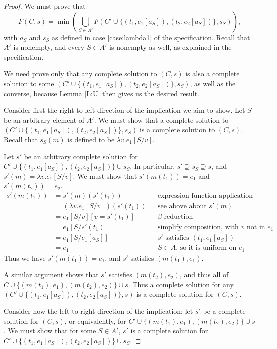\documentclass{article}
\begin{document}
\begin{proof}
We must prove that
	$$ 	F(C,s) = \min\left(\bigcup_{S\in A'} F(C'\cup\{(t_1,e_1[a_S]),(t_2,e_2[a_S])\},s_S)\right),	$$
with $a_S$ and $s_S$ as defined in case \ref{case:lambda1} of the specification.  Recall that $A'$ is nonempty, and every $S\in A'$ is nonempty as well, as explained in the specification.

We need prove only that any complete solution to $(C,s)$ is also a complete solution to some $(C'\cup\{(t_1,e_1[a_S]),(t_2,e_2[a_S])\},s_S)$, as well as the converse, because Lemma \ref{L:U} then gives us the desired result.

Consider first the right-to-left direction of the implication we aim to show.  Let $S$ be an arbitrary element of $A'$.  We must show that a complete solution to $(C'\cup\{(t_1,e_1[a_S]),(t_2,e_2[a_S])\},s_S)$ is a complete solution to $(C,s)$.  Recall that $s_S(m)$ is defined to be $\lambda v.e_1[S/v]$.

Let $s'$ be an arbitrary complete solution for $C'\cup\{(t_1,e_1[a_S]),(t_2,e_2[a_S])\}\cup s_S$.  In particular, $s'\supseteq s_S\supseteq s$, and $s'(m)=\lambda v.e_1[S/v]$.  We must show that $s'(m(t_1))=e_1$ and $s'(m(t_2))=e_2$.
	\begin{align*}
		s'(m(t_1))	&=	s'(m)(s'(t_1))					&&	\text{expression function application structure}	\\
					&=	(\lambda v.e_1[S/v])(s'(t_1))	&&	\text{see above about $s'(m)$}	\\
					&=	e_1[S/v][v=s'(t_1)]				&&	\text{$\beta$ reduction}	\\
					&=	e_1[S/s'(t_1)]					&&	\text{simplify composition, with $v$ not in $e_1$}	\\
					&=	e_1[S/e_1[a_S]]					&&	\text{$s'$ satisfies $(t_1,e_1[a_S])$}	\\
					&=	e_1								&&	\text{$S\in A$, so it is uniform on $e_1$}
	\end{align*}
Thus we have $s'(m(t_1))=e_1$, and $s'$ satisfies $(m(t_1),e_1)$.

A similar argument shows that $s'$ satisfies $(m(t_2),e_2)$, and thus all of $C\cup\{(m(t_1),e_1),(m(t_2),e_2)\}\cup s$.  Thus a complete solution for any $(C'\cup\{(t_1,e_1[a_S]),(t_2,e_2[a_S])\},s)$ is a complete solution for $(C,s)$.

Consider now the left-to-right direction of the implication; let $s'$ be a complete solution for $(C,s)$, or equivalently, for $C'\cup\{(m(t_1),e_1),(m(t_2),e_2)\}\cup s$.  We must show that for some $S\in A'$, $s'$ is a complete solution for $C'\cup\{(t_1,e_1[a_S]),(t_2,e_2[a_S])\}\cup s_S$.


\end{proof}
\end{document}
